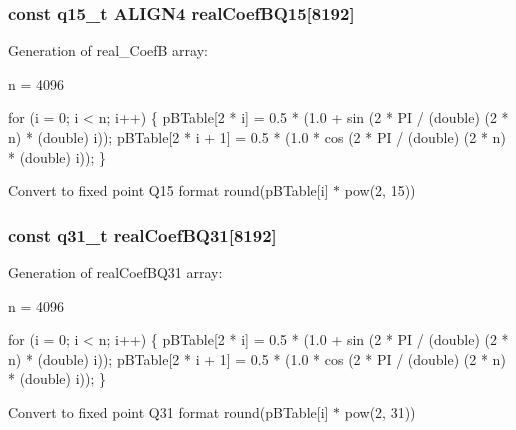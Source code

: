 \subsubsection[{\texorpdfstring{real\+Coef\+B\+Q15}{realCoefBQ15}}]{\setlength{\rightskip}{0pt plus 5cm}const q15\+\_\+t A\+L\+I\+G\+N4 real\+Coef\+B\+Q15\mbox{[}8192\mbox{]}}\hypertarget{group__RealFFT__Table_gac871666f018b70938b2b98017628cb97}{}\label{group__RealFFT__Table_gac871666f018b70938b2b98017628cb97}
\begin{DoxyParagraph}{}
Generation of real\+\_\+\+CoefB array\+: 
\end{DoxyParagraph}
\begin{DoxyParagraph}{}
n = 4096 
\begin{DoxyPre}for (i = 0; i < n; i++)
 \{
   pBTable[2 * i] = 0.5 * (1.0 + sin (2 * PI / (double) (2 * n) * (double) i));
   pBTable[2 * i + 1] = 0.5 * (1.0 * cos (2 * PI / (double) (2 * n) * (double) i));
 \} \end{DoxyPre}
 
\end{DoxyParagraph}
\begin{DoxyParagraph}{}
Convert to fixed point Q15 format round(p\+B\+Table\mbox{[}i\mbox{]} $\ast$ pow(2, 15)) 
\end{DoxyParagraph}
\subsubsection[{\texorpdfstring{real\+Coef\+B\+Q31}{realCoefBQ31}}]{\setlength{\rightskip}{0pt plus 5cm}const q31\+\_\+t real\+Coef\+B\+Q31\mbox{[}8192\mbox{]}}\hypertarget{group__RealFFT__Table_ga1eb5745728a61c3715755f5d69a4a960}{}\label{group__RealFFT__Table_ga1eb5745728a61c3715755f5d69a4a960}
\begin{DoxyParagraph}{}
Generation of real\+Coef\+B\+Q31 array\+: 
\end{DoxyParagraph}
\begin{DoxyParagraph}{}
n = 4096 
\begin{DoxyPre}for (i = 0; i < n; i++)
\{
   pBTable[2 * i] = 0.5 * (1.0 + sin (2 * PI / (double) (2 * n) * (double) i));
   pBTable[2 * i + 1] = 0.5 * (1.0 * cos (2 * PI / (double) (2 * n) * (double) i));
\} \end{DoxyPre}
 
\end{DoxyParagraph}
\begin{DoxyParagraph}{}
Convert to fixed point Q31 format round(p\+B\+Table\mbox{[}i\mbox{]} $\ast$ pow(2, 31)) 
\end{DoxyParagraph}
